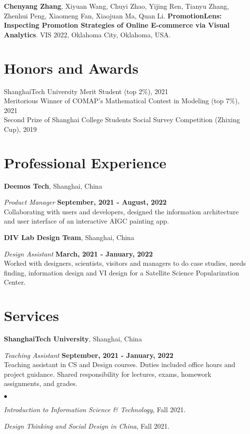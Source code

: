 \documentclass[margin,line]{res}
\newenvironment{list2}{
  \begin{list}{$\bullet$}{%
      \setlength{\itemsep}{0in}
      \setlength{\parsep}{0in} \setlength{\parskip}{0in}
      \setlength{\topsep}{0in} \setlength{\partopsep}{0in} 
      \setlength{\leftmargin}{0.2in}}}{\end{list}}
\begin{document}
\begin{resume}
\textbf{Chenyang Zhang}, Xiyuan Wang, Chuyi Zhao, Yijing Ren, Tianyu Zhang, Zhenhui Peng, Xiaomeng Fan, Xiaojuan Ma, Quan Li. \textbf{PromotionLens: Inspecting Promotion Strategies of Online E-commerce via Visual Analytics}. VIS 2022, Oklahoma City, Oklahoma, USA.


\section{Honors and Awards} 
ShanghaiTech University Merit Student (top 2\%), 2021 \\
Meritorious Winner of COMAP's Mathematical Contest in Modeling (top 7\%), 2021\\
Second Prize of Shanghai College Students Social Survey Competition (Zhixing Cup), 2019


\section{Professional Experience}

{\bf Deemos Tech}, Shanghai, China

\vspace{-.3cm}
{\em Product Manager} \hfill {\bf September, 2021 - August, 2022}\\
Collaborating with users and developers, designed the information architecture and user interface of an interactive AIGC painting app.

{\bf DIV Lab Design Team}, Shanghai, China

\vspace{-.3cm}
{\em Design Assistant} \hfill {\bf
  March, 2021 - January, 2022}\\
Worked with designers, scientists, visitors and managers to do case studies, needs finding, information design and VI design for a Satellite Science Popularization Center.


\section{Services} 

{\bf ShanghaiTech University}, Shanghai, China

\vspace{-.2cm}
{\em Teaching Assistant} \hfill {\bf September, 2021 - January, 2022}\\
Teaching assistant in CS and Design courses. Duties included office hours and project guidance. Shared responsibility for lectures, exams, homework assignments, and grades. 
\begin{list2}
\item \textit{Introduction to Information Science \& Technology}, Fall 2021.
\item \textit{Design Thinking and Social Design in China}, Fall 2021.
\end{list2}



\end{resume}
\end{document}
